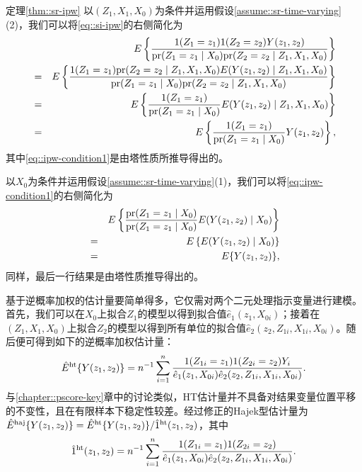 \begin{myproof}{定理}{\ref{thm::sr-ipw}}
以$(Z_1, X_1, X_0)$为条件并运用假设\ref{assume::sr-time-varying}(2)，我们可以将\eqref{eq::si-ipw}的右侧简化为
\begin{eqnarray} 
&&E\left\{    \frac{  1(Z_1=z_1) 1(Z_2=z_2) Y(z_1,z_2)  }{    \textup{pr}(Z_1=z_1\mid X_0)  \textup{pr}(Z_2 = z_2 \mid Z_1, X_1, X_0)    }   \right\} \nonumber  \\
&=& E\left\{    \frac{  1(Z_1=z_1) \textup{pr}(Z_2=z_2\mid Z_1, X_1, X_0) E(Y(z_1,z_2) \mid Z_1, X_1, X_0)  }{    \textup{pr}(Z_1=z_1\mid X_0)  \textup{pr}(Z_2 = z_2 \mid Z_1, X_1, X_0)    }   \right\}  \nonumber    \\
&=& E\left\{    \frac{  1(Z_1=z_1)    }{    \textup{pr}(Z_1=z_1\mid X_0)     }  E(Y(z_1,z_2) \mid Z_1, X_1, X_0)  \right\}   \nonumber   \\
&=& E\left\{    \frac{  1(Z_1=z_1)    }{    \textup{pr}(Z_1=z_1\mid X_0)     }  Y(z_1,z_2)  \right\}, \label{eq::ipw-condition1}
\end{eqnarray}
其中\eqref{eq::ipw-condition1}是由塔性质所推导得出的。 


以$X_0$为条件并运用假设\ref{assume::sr-time-varying}(1)，我们可以将\eqref{eq::ipw-condition1}的右侧简化为
\begin{eqnarray*} 
&& E\left\{    \frac{  \textup{pr}(Z_1=z_1\mid X_0)    }{    \textup{pr}(Z_1=z_1\mid X_0)     }  E(Y(z_1,z_2) \mid X_0)  \right\}\\
&=& E\left\{    E(Y(z_1,z_2) \mid X_0)  \right\}\\
&=&  E\{Y(z_1,z_2)\},
\end{eqnarray*}
同样，最后一行结果是由塔性质推导得出的。 
\end{myproof}


  
 
  
 
 基于逆概率加权的估计量要简单得多，它仅需对两个二元处理指示变量进行建模。首先，我们可以在$X_0$上拟合$Z_1$的模型以得到拟合值$\hat{e}_{1}(z_1, X_{0i})$；接着在$(Z_1, X_1, X_0)$上拟合$Z_2$的模型以得到所有单位的拟合值$\hat{e}_{2}(z_2, Z_{1i}, X_{1i}, X_{0i})$。随后便可得到如下的逆概率加权估计量：
$$
\hat{E}^\textup{ht}\{ Y(z_1, z_2) \}  = n^{-1} \sum_{i=1}^n 
  \frac{  1(Z_{1i}=z_1) 1(Z_{2i}=z_2) Y_i  }{   \hat{e}_{1}(z_1, X_{0i}) \hat{e}_{2} (z_2, Z_{1i}, X_{1i}, X_{0i})   }  .
$$
与\ref{chapter::pscore-key}章中的讨论类似，HT估计量并不具备对结果变量位置平移的不变性，且在有限样本下稳定性较差。经过修正的Hajek型估计量为$\hat{E}^\textup{haj}\{ Y(z_1, z_2) \}  = \hat{E}^\textup{ht}\{ Y(z_1, z_2) \}   / \hat 1^\textup{ht}(z_1,z_2)$，其中
$$
\hat 1^\textup{ht}(z_1,z_2)  = n^{-1}  \sum_{i=1}^n 
  \frac{  1(Z_{1i}=z_1) 1(Z_{2i}=z_2)  }{   \hat{e}_{1} (z_1, X_{0i})\hat{e}_{2} (z_2, Z_{1i}, X_{1i}, X_{0i})   }  .
$$


